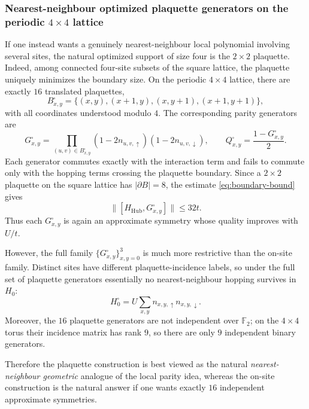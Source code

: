 \documentclass[11pt]{article}
\theoremstyle{definition}
\theoremstyle{remark}
\begin{document}
\subsubsection{Nearest-neighbour optimized plaquette generators on the periodic $4\times 4$ lattice}
If one instead wants a genuinely nearest-neighbour local polynomial involving several sites, the natural optimized support of size four is the $2\times 2$ plaquette. Indeed, among connected four-site subsets of the square lattice, the plaquette uniquely minimizes the boundary size. On the periodic $4\times 4$ lattice, there are exactly $16$ translated plaquettes,
\begin{equation}
  B_{x,y}^{\square}
  =
  \{(x,y),(x+1,y),(x,y+1),(x+1,y+1)\},
\end{equation}
with all coordinates understood modulo $4$. The corresponding parity generators are
\begin{equation}
  G_{x,y}^{\square}
  =
  \prod_{(u,v)\in B_{x,y}^{\square}}
  (1-2n_{u,v,\uparrow})(1-2n_{u,v,\downarrow}),
  \qquad
  Q_{x,y}^{\square}=\frac{1-G_{x,y}^{\square}}{2}.
\end{equation}
Each generator commutes exactly with the interaction term and fails to commute only with the hopping terms crossing the plaquette boundary. Since a $2\times 2$ plaquette on the square lattice has $|\partial B|=8$, the estimate \eqref{eq:boundary-bound} gives
\begin{equation}
  \|[H_{\mathrm{Hub}},G_{x,y}^{\square}]\|\le 32t.
\end{equation}
Thus each $G_{x,y}^{\square}$ is again an approximate symmetry whose quality improves with $U/t$.

However, the full family $\{G_{x,y}^{\square}\}_{x,y=0}^3$ is much more restrictive than the on-site family. Distinct sites have different plaquette-incidence labels, so under the full set of plaquette generators essentially no nearest-neighbour hopping survives in $H_0$:
\begin{equation}
  H_0^{\square}=U\sum_{x,y}n_{x,y,\uparrow}n_{x,y,\downarrow}.
\end{equation}
Moreover, the $16$ plaquette generators are not independent over $\mathbb F_2$; on the $4\times 4$ torus their incidence matrix has rank $9$, so there are only $9$ independent binary generators.

Therefore the plaquette construction is best viewed as the natural \emph{nearest-neighbour geometric} analogue of the local parity idea, whereas the on-site construction is the natural answer if one wants exactly $16$ independent approximate symmetries.
\end{document}
